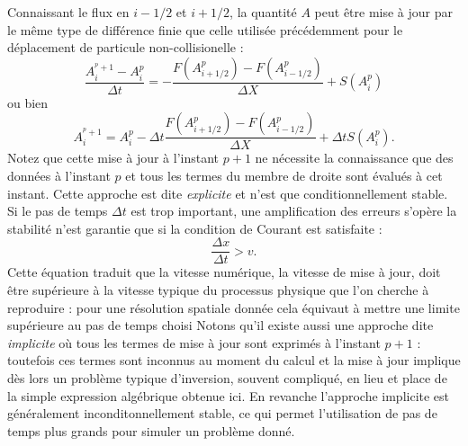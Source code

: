  Connaissant le flux en $i-1/2$ et $i+1/2$, la quantité $A$ peut être mise à jour par le même type de différence finie que celle utilisée précédemment pour le déplacement de particule non-collisionelle :
 \begin{equation}
 \frac{A_i^{^p+1}-A_i^p}{\Delta t}=-\frac{F(A_{i+1/2}^p)-F(A_{i-1/2}^p)}{\Delta X}+S(A_i^p)
 \end{equation}
 ou bien
 \begin{equation}
 A_i^{^p+1}=A_i^p-\Delta t \frac{F(A_{i+1/2}^p)-F(A_{i-1/2}^p)}{\Delta X}+\Delta t S(A_i^p).
 \end{equation}
Notez que cette mise à jour à l'instant $p+1$ ne nécessite la connaissance que des données à l'instant $p$ et tous les termes du membre de droite sont évalués à cet instant. Cette approche est dite \textit{explicite} et n'est que conditionnellement stable. Si le pas de temps $\Delta t$ est trop important, une amplification des erreurs s'opère la stabilité n'est garantie que si la condition de Courant est satisfaite :
\begin{equation}
\frac{\Delta x}{ \Delta t}> v.
\end{equation}
Cette équation traduit que la vitesse numérique, la vitesse de mise à jour, doit être supérieure à la vitesse typique du processus physique que l'on cherche à reproduire : pour une résolution spatiale donnée cela équivaut à mettre une limite supérieure au pas de temps choisi  Notons qu'il existe aussi une approche dite \textit{implicite} où tous les termes de mise à jour sont exprimés à l'instant $p+1$ : toutefois ces termes sont inconnus au moment du calcul et la mise à jour implique dès lors un problème typique d'inversion, souvent compliqué, en lieu et place de la simple expression algébrique obtenue ici. En revanche l'approche implicite est généralement inconditonnellement stable, ce qui permet l'utilisation de pas de temps plus grands pour simuler un problème donné.

